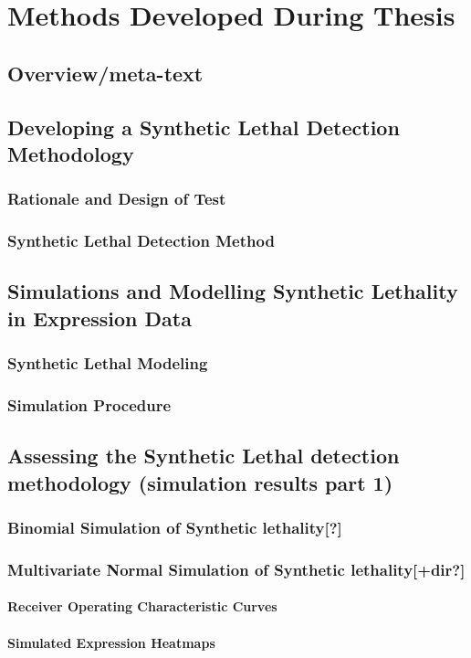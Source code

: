 \chapter{Methods Developed During Thesis}
\label{chap:methods_dev}
\section{Overview/meta-text}
\section{Developing a Synthetic Lethal Detection Methodology}
\subsection{Rationale and Design of Test}
\subsection{Synthetic Lethal Detection Method}
\section{Simulations and Modelling Synthetic Lethality in Expression Data}
\subsection{Synthetic Lethal Modeling}
\subsection{Simulation Procedure}
\section{Assessing the Synthetic Lethal detection methodology (simulation results part 1)}
\subsection{Binomial Simulation of Synthetic lethality[?]}
\subsection{Multivariate Normal Simulation of Synthetic lethality[+dir?]}
\subsubsection{Receiver Operating Characteristic Curves}
\subsubsection{Simulated Expression Heatmaps}
